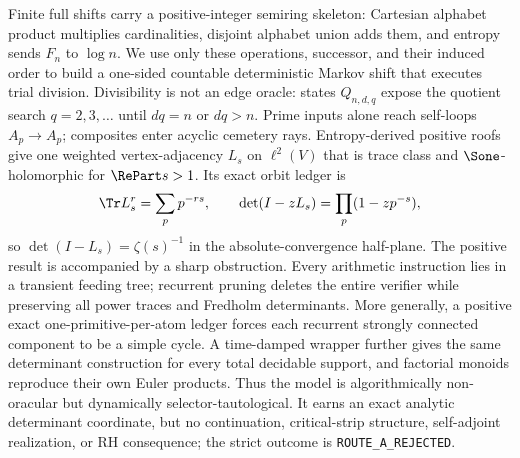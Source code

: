 Finite full shifts carry a positive-integer semiring skeleton: Cartesian
alphabet product multiplies cardinalities, disjoint alphabet union adds them,
and entropy sends $F_n$ to $\log n$.  We use only these operations, successor,
and their induced order to build a one-sided countable deterministic Markov
shift that executes trial division.  Divisibility is not an edge oracle:
states $Q_{n,d,q}$ expose the quotient search $q=2,3,\ldots$ until
$dq=n$ or $dq>n$.  Prime inputs alone reach self-loops $A_p\to A_p$;
composites enter acyclic cemetery rays.  Entropy-derived positive roofs give
one weighted vertex-adjacency $L_s$ on $\ell^2(V)$ that is trace class and
$\Sone$-holomorphic for $\RePart s>1$.  Its exact orbit ledger is
\[
\Tr L_s^r=\sum_p p^{-rs},\qquad
\det(I-zL_s)=\prod_p(1-zp^{-s}),
\]
so $\det(I-L_s)=\zeta(s)^{-1}$ in the absolute-convergence half-plane.
The positive result is accompanied by a sharp obstruction.  Every arithmetic
instruction lies in a transient feeding tree; recurrent pruning deletes the
entire verifier while preserving all power traces and Fredholm determinants.
More generally, a positive exact one-primitive-per-atom ledger forces each
recurrent strongly connected component to be a simple cycle.  A time-damped
wrapper further gives the same determinant construction for every total
decidable support, and factorial monoids reproduce their own Euler products.
Thus the model is algorithmically non-oracular but dynamically
selector-tautological.  It earns an exact analytic determinant coordinate,
but no continuation, critical-strip structure, self-adjoint realization, or
RH consequence; the strict outcome is \texttt{ROUTE\_A\_REJECTED}.
